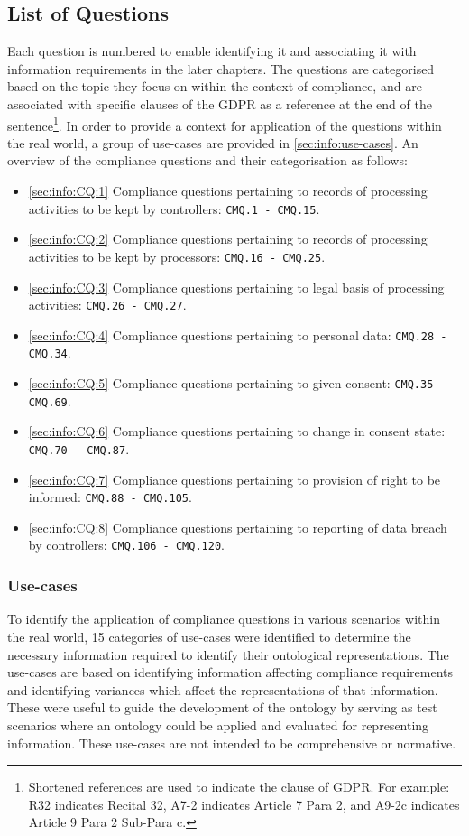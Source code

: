\subsection{List of Questions}\label{sec:info:compliance-questions-list}
Each question is numbered to enable identifying it and associating it with information requirements in the later chapters. The questions are categorised based on the topic they focus on within the context of compliance, and are associated with specific clauses of the GDPR as a reference at the end of the sentence\footnote{Shortened references are used to indicate the clause of GDPR. For example: R32 indicates Recital 32, A7-2 indicates Article 7 Para 2, and A9-2c indicates Article 9 Para 2 Sub-Para c.}.
In order to provide a context for application of the questions within the real world, a group of use-cases are provided in \autoref{sec:info:use-cases}.
An overview of the compliance questions and their categorisation as follows:
\begin{itemize}
	\item \autoref{sec:info:CQ:1} Compliance questions pertaining to records of processing activities to be kept by controllers: \texttt{CMQ.1 - CMQ.15}.
	\item \autoref{sec:info:CQ:2} Compliance questions pertaining to records of processing activities to be kept by processors: \texttt{CMQ.16 - CMQ.25}.
	\item \autoref{sec:info:CQ:3} Compliance questions pertaining to legal basis of processing activities: \texttt{CMQ.26 - CMQ.27}.
	\item \autoref{sec:info:CQ:4} Compliance questions pertaining to personal data: \texttt{CMQ.28 - CMQ.34}.
	\item \autoref{sec:info:CQ:5} Compliance questions pertaining to given consent: \texttt{CMQ.35 - CMQ.69}.
	\item \autoref{sec:info:CQ:6} Compliance questions pertaining to change in consent state: \texttt{CMQ.70 - CMQ.87}.
	\item \autoref{sec:info:CQ:7} Compliance questions pertaining to provision of right to be informed: \texttt{CMQ.88 - CMQ.105}.
	\item \autoref{sec:info:CQ:8} Compliance questions pertaining to reporting of data breach by controllers: \texttt{CMQ.106 - CMQ.120}.
\end{itemize} 

\subsubsection{Use-cases}\label{sec:info:use-cases}
To identify the application of compliance questions in various scenarios within the real world, 15 categories of use-cases were identified to determine the necessary information required to identify their ontological representations.
The use-cases are based on identifying information affecting compliance requirements and identifying variances which affect the representations of that information.
These were useful to guide the development of the ontology by serving as test scenarios where an ontology could be applied and evaluated for representing information.
These use-cases are not intended to be comprehensive or normative.

